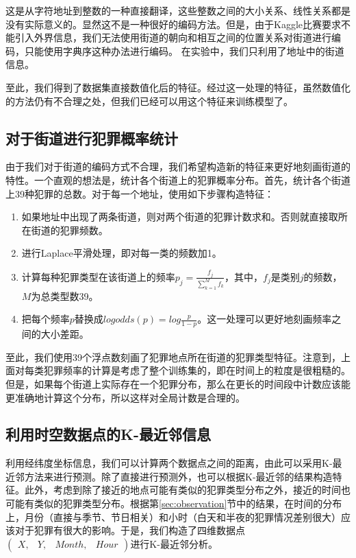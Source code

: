 这是从字符地址到整数的一种直接翻译，这些整数之间的大小关系、线性关系都是没有实际意义的。显然这不是一种很好的编码方法。但是，由于Kaggle比赛要求不能引入外界信息，我们无法使用街道的朝向和相互之间的位置关系对街道进行编码，只能使用字典序这种办法进行编码。
在实验中，我们只利用了地址中的街道信息。

至此，我们得到了数据集直接数值化后的特征。经过这一处理的特征，虽然数值化的方法仍有不合理之处，但我们已经可以用这个特征来训练模型了。

\subsection{对于街道进行犯罪概率统计}
\label{subsec:feature3}

由于我们对于街道的编码方式不合理，我们希望构造新的特征来更好地刻画街道的特性。一个直观的想法是，统计各个街道上的犯罪概率分布。首先，统计各个街道上39种犯罪的总数。对于每一个地址，使用如下步骤构造特征：

\begin{enumerate}
    \item 如果地址中出现了两条街道，则对两个街道的犯罪计数求和。否则就直接取所在街道的犯罪频数。
    \item 进行Laplace平滑处理，即对每一类的频数加1。
    \item 计算每种犯罪类型在该街道上的频率$p_j = \frac{f_j} {\sum_{k=1}^M f_k}$，其中，$f_j$是类别$j$的频数，$M$为总类型数39。
    \item 把每个频率$p$替换成$logodds(p)=log\frac{p}{1-p}$。这一处理可以更好地刻画频率之间的大小差距。
\end{enumerate}

至此，我们使用39个浮点数刻画了犯罪地点所在街道的犯罪类型特征。注意到，上面对每类犯罪频率的计算是考虑了整个训练集的，即在时间上的粒度是很粗糙的。但是，如果每个街道上实际存在一个犯罪分布，那么在更长的时间段中计数应该能更准确地计算这个分布，所以这样对全局计数是合理的。

\subsection{利用时空数据点的K-最近邻信息}
\label{subsec:feature4}

利用经纬度坐标信息，我们可以计算两个数据点之间的距离，由此可以采用K-最近邻方法来进行预测。除了直接进行预测外，也可以根据K-最近邻的结果构造特征。此外，考虑到除了接近的地点可能有类似的犯罪类型分布之外，接近的时间也可能有类似的犯罪类型分布。根据第\ref{sec:observation}节中的结果，在时间的分布上，月份（直接与季节、节日相关）和小时（白天和半夜的犯罪情况差别很大）应该对于犯罪有很大的影响。于是，我们构造了四维数据点$(\begin{array}{cccc}X, & Y, & Month, & Hour\end{array})$进行K-最近邻分析。

